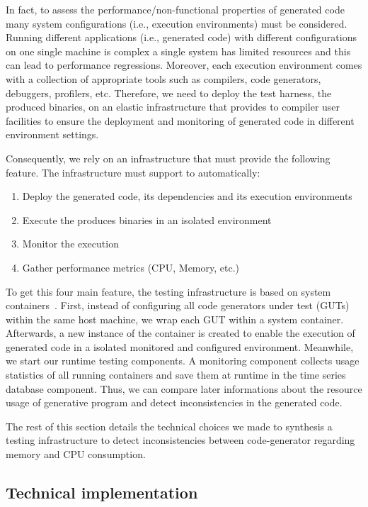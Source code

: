 In fact, to assess the performance/non-functional properties of generated code many system configurations (i.e., execution environments) must be considered. Running different applications (i.e., generated code) with different configurations on one single machine is complex  a single system has limited resources and this can lead to performance regressions. Moreover, each execution environment comes with a collection of appropriate tools such as compilers, code generators, debuggers, profilers, etc. Therefore, we need to deploy the test harness, \ie the produced binaries, on an elastic infrastructure that provides to compiler user facilities to ensure the deployment and monitoring of generated code in different environment settings. 

Consequently, we rely on an infrastructure that must provide the following feature. The infrastructure must support to automatically:
\begin{enumerate}
	\item Deploy the generated code, its dependencies and its  execution environments
	\item Execute the produces binaries in an isolated environment 
	\item Monitor the execution
	\item Gather performance metrics (CPU, Memory, etc.)
\end{enumerate}

To get this four main feature, the testing infrastructure is based on system containers~\cite{xxx}. First, instead of configuring all code generators under test (GUTs) within the same host machine, we wrap each GUT within a system container. Afterwards, a new instance of the container is created to enable the execution of generated code in a isolated monitored and configured environment. Meanwhile, we start our runtime testing components. A monitoring component collects usage statistics of all running containers and save them at runtime in the time series database component. Thus, we can compare later informations about the resource usage of generative program and detect inconsistencies in the generated code.


The rest of this section details the technical choices we made to synthesis a testing infrastructure to detect inconsistencies between code-generator regarding memory and CPU consumption.  

\subsection{Technical implementation}

